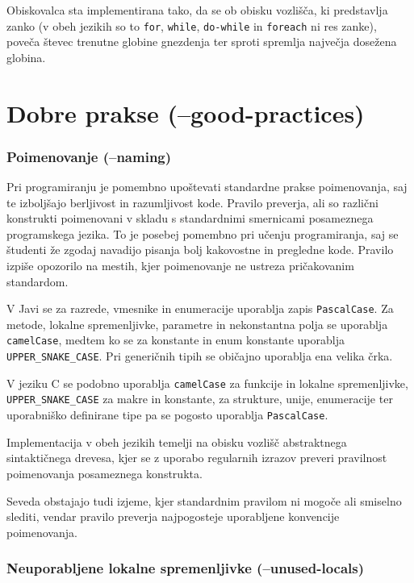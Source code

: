 \documentclass[a4paper,12pt,openright]{book}
\begin{document}
Obiskovalca sta implementirana tako, da se ob obisku vozlišča, ki predstavlja zanko (v obeh jezikih so to \texttt{for}, \texttt{while}, \texttt{do-while} in \texttt{foreach} ni res zanke), poveča števec trenutne globine gnezdenja ter sproti spremlja največja dosežena globina.

\section{Dobre prakse (--good-practices)}

\subsubsection{Poimenovanje (--naming)}

Pri programiranju je pomembno upoštevati standardne prakse poimenovanja, saj te izboljšajo berljivost in razumljivost kode. Pravilo preverja, ali so različni konstrukti poimenovani v skladu s standardnimi smernicami posameznega programskega jezika. To je posebej pomembno pri učenju programiranja, saj se študenti že zgodaj navadijo pisanja bolj kakovostne in pregledne kode. Pravilo izpiše opozorilo na mestih, kjer poimenovanje ne ustreza pričakovanim standardom.

V Javi se za razrede, vmesnike in enumeracije uporablja zapis \texttt{PascalCase}. Za metode, lokalne spremenljivke, parametre in nekonstantna polja se uporablja \texttt{camelCase}, medtem ko se za konstante in enum konstante uporablja \texttt{UPPER\_SNAKE\_CASE}. Pri generičnih tipih se običajno uporablja ena velika črka.

V jeziku C se podobno uporablja \texttt{camelCase} za funkcije in lokalne spremenljivke, \texttt{UPPER\_SNAKE\_CASE} za makre in konstante, za strukture, unije, enumeracije ter uporabniško definirane tipe pa se pogosto uporablja \texttt{PascalCase}.

Implementacija v obeh jezikih temelji na obisku vozlišč abstraktnega sintaktičnega drevesa, kjer se z uporabo regularnih izrazov preveri pravilnost poimenovanja posameznega konstrukta.

Seveda obstajajo tudi izjeme, kjer standardnim pravilom ni mogoče ali smiselno slediti, vendar pravilo preverja najpogosteje uporabljene konvencije poimenovanja.

\subsubsection{Neuporabljene lokalne spremenljivke (--unused-locals)}
\end{document}
